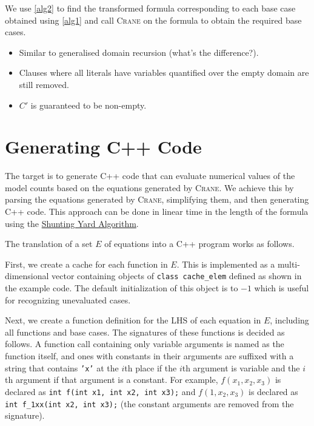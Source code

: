 \documentclass{article}
\begin{document}

We use \cref{alg2} to find the transformed formula corresponding to each base
case obtained using \cref{alg1} and call \textsc{Crane} on the formula to obtain
the required base cases.

\begin{itemize}
  \item Similar to generalised domain recursion (what's the difference?).
  \item Clauses where all literals have variables quantified over the empty
        domain are still removed.
  \item $C'$ is guaranteed to be non-empty.
\end{itemize}

\section{Generating C++ Code}\label{sec:cpp}


The target is to generate C++ code that can evaluate numerical values of the
model counts based on the equations generated by \textsc{Crane}. We achieve this
by parsing the equations generated by \textsc{Crane}, simplifying them, and then
generating C++ code. This approach can be done in linear time in the length of
the formula using
the
\href{https://en.wikipedia.org/wiki/Shunting_yard_algorithm#:~:text=In%20computer%20science%2C%20the%20shunting,abstract%20syntax%20tree%20(AST).}{Shunting
  Yard Algorithm}.

The translation of a set $E$ of equations into a C++ program works as follows.

First, we create a cache for each function in $E$. This is implemented as a
multi-dimensional vector containing objects of \texttt{class cache\_elem}
defined as shown in the example code. The default initialization of this object
is to $-1$ which is useful for recognizing unevaluated cases.

Next, we create a function definition for the LHS of each equation in $E$,
including all functions and base cases. The signatures of these functions is
decided as follows. A function call containing only variable arguments is named
as the function itself, and ones with constants in their arguments are suffixed
with a string that contains \texttt{'x'} at the $i$th place if the $i$th
argument is variable and the $i$th argument if that argument is a constant. For
example, $f(x_{1}, x_{2}, x_{3})$ is declared as \texttt{int f(int x1, int x2,
  int x3);} and $f(1, x_{2}, x_{3})$ is declared as \texttt{int f\_1xx(int x2,
  int x3);} (the constant arguments are removed from the signature).
\end{document}
